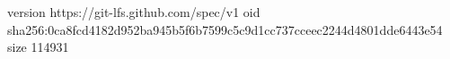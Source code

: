 version https://git-lfs.github.com/spec/v1
oid sha256:0ca8fcd4182d952ba945b5f6b7599c5c9d1cc737cceec2244d4801dde6443e54
size 114931
